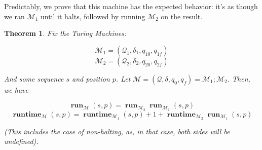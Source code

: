 \documentclass{article}
\newtheorem{theorem}{Theorem}
\newcommand{\M}{\mathcal{M}}
\newcommand{\Q}{\mathcal{Q}}
\DeclareMathOperator{\run}{\mathbf{run}}
\DeclareMathOperator{\runtime}{\mathbf{runtime}}
\begin{document}
	Predictably, we prove that this machine has the expected behavior: it's as though we ran $\M_1$ until it halts, followed by running $\M_2$ on the result.
	
	\begin{theorem}
	Fix the Turing Machines:
	
	\[\M_1 = (\Q_1, \delta_1, q_{10}, q_{1f})\]
	\[\M_2 = (\Q_2, \delta_2, q_{20}, q_{2f})\]
	
	And some sequence $s$ and position $p$. Let $\M = (\Q, \delta, q_0, q_f) = \M_1 ; \M_2$. Then, we have
	
	\[\run_\M (s,p) = \run_{\M_2} \run_{\M_1} (s,p)\]
	\[\runtime_\M (s,p) = \runtime_{\M_1} (s,p) + 1 + \runtime_{\M_2} \run_{\M_1} (s,p)\]
	
	(This includes the case of non-halting, as, in that case, both sides will be undefined).
	\end{theorem}
	
\end{document}
